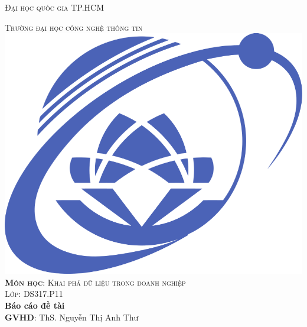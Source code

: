 \documentclass[12pt, a4]{article}
\begin{document}
\begin{titlepage}
    \begin{center}
        \begin{centering}
            \textsc{\LARGE Đại học quốc gia TP.HCM}
        
            
\textsc{\LARGE Trường đại học công nghệ thông tin}\\[1cm] 
        
        \includegraphics[scale=0.25]{figures/UIT_Logo.png}\\[1.0cm]
        

\textsc{\large \textbf{Môn học}: Khai phá dữ liệu trong doanh nghiệp}\\[0.5cm] 
\textsc{\large Lớp: DS317.P11}\\[1cm] 


{\huge \bfseries Báo cáo đề tài}\\[0.3cm]
{\large \textbf{GVHD}: ThS. Nguyễn Thị Anh Thư}\\[1cm] 


\end{centering}
\end{center}
\end{titlepage}
\end{document}
